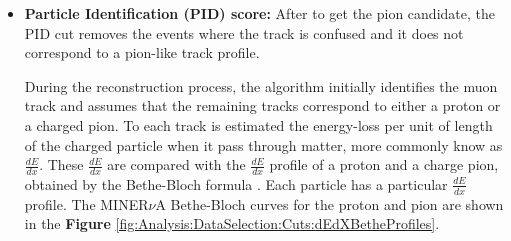 \begin{itemize}
    
    \item \textbf{Particle Identification (PID) score:} After to get the pion candidate, the PID cut removes the events where the track is confused and it does not correspond to a pion-like track profile.
    
    During the reconstruction process, the algorithm initially identifies the muon track and assumes that the remaining tracks correspond to either a proton or a charged pion. To each track is estimated the energy-loss per unit of length of the charged particle when it pass through matter, more commonly know as $\frac{dE}{dx}$. These $\frac{dE}{dx}$ are compared with the $\frac{dE}{dx}$ profile of a proton and a charge pion, obtained by the Bethe-Bloch formula \cite{DetectionTechniques}. Each particle has a particular $\frac{dE}{dx}$ profile. The MINER$\nu$A Bethe-Bloch curves for the proton and pion are shown in the \textbf{Figure} \ref{fig:Analysis:DataSelection:Cuts:dEdXBetheProfiles}. 



\end{itemize}
